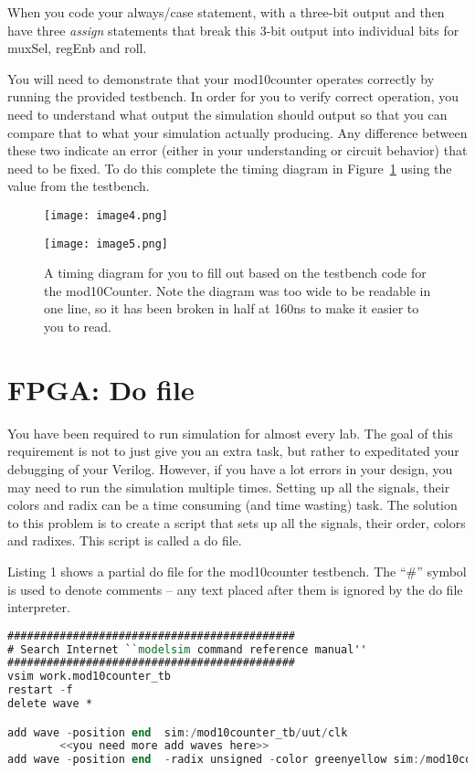 When you code your always/case statement, with a three-bit output and
then have three \emph{assign} statements that break this 3-bit output
into individual bits for muxSel, regEnb and roll.

You will need to demonstrate that your mod10counter operates correctly
by running the provided testbench. In order for you to verify correct
operation, you need to understand what output the simulation should
output so that you can compare that to what your simulation actually
producing. Any difference between these two indicate an error (either in
your understanding or circuit behavior) that need to be fixed. To do
this complete the timing diagram in Figure~\ref{fig:mod10TimingDiamgram} using the value from the
testbench.

\begin{landscape}
\begin{figure}[ht]
\texttt{[image: image4.png]}

\texttt{[image: image5.png]}

\caption{A timing diagram for you to fill out based on the testbench
code for the mod10Counter. Note the diagram was too wide to be readable
in one line, so it has been broken in half at 160ns to make it easier to
you to read.}
\label{fig:mod10TimingDiamgram}
\end{figure}
\end{landscape}

\section{FPGA: Do file}

You have been required to run simulation for almost every lab. The goal
of this requirement is not to just give you an extra task, but rather to
expeditated your debugging of your Verilog. However, if you have a lot
errors in your design, you may need to run the simulation multiple
times. Setting up all the signals, their colors and radix can be a time
consuming (and time wasting) task. The solution to this problem is to
create a script that sets up all the signals, their order, colors and
radixes. This script is called a do file.

Listing 1 shows a partial do file for the mod10counter testbench. The
``\#'' symbol is used to denote comments -- any text placed after them
is ignored by the do file interpreter.


\begin{lstlisting}[language=Verilog,
 caption={A partial do file for the mod10counter.},
basicstyle=\tiny\ttfamily,
 label={listing:hiLowWinVerilog},
 frame=single]
############################################
# Search Internet ``modelsim command reference manual''
############################################
vsim work.mod10counter_tb
restart -f
delete wave *

add wave -position end  sim:/mod10counter_tb/uut/clk
		<<you need more add waves here>>
add wave -position end  -radix unsigned -color greenyellow sim:/mod10counter_tb/uut/currentCount
 \end{lstlisting}
 
